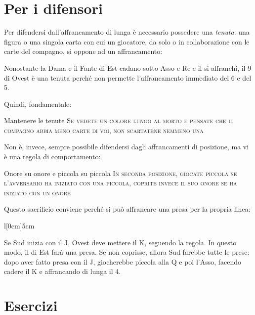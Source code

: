 \documentclass[../corsofiori.tex]{subfiles}
\begin{document}
\section{Per i difensori}

Per difendersi dall'affrancamento di lunga è necessario possedere una \emph{tenuta}: una figura o una singola carta con cui un giocatore, da solo o in
collaborazione con le carte del compagno, si oppone ad un affrancamento:
\newpage


Nonostante la Dama e il Fante di Est cadano sotto Asso e Re e il \Ten si affranchi, il 9 di Ovest è una tenuta perché
non permette l'affrancamento immediato del 6 e del 5.

Quindi, fondamentale:


\begin{regola}{Mantenere le tenute}
    \textsc{Se vedete un colore lungo al morto e pensate che il compagno abbia meno carte di voi, non scartatene nemmeno una}
\end{regola}

Non è, invece, sempre possibile difendersi dagli affrancamenti di posizione, ma vi è una regola di comportamento:


\begin{regola}{Onore su onore e piccola su piccola}
    \textsc{In seconda posizione, giocate piccola se l'avversario ha iniziato con una piccola, coprite invece il suo
        onore se ha iniziato con un onore}
\end{regola}


Questo sacrificio conviene perché si può affrancare una presa per la propria linea:

\begin{wraptable}[7]{l}[0cm]{5cm}
\end{wraptable}

Se Sud inizia con il J, Ovest deve mettere il K, seguendo la regola. In questo modo, il \Ten di Est farà una presa. Se
non coprisse, allora Sud farebbe tutte le prese: dopo aver fatto presa con il J, giocherebbe piccola alla Q e poi
l'Asso, facendo cadere il K e affrancando di lunga il 4.



\clearpage
\section*{Esercizi}
\end{document}
